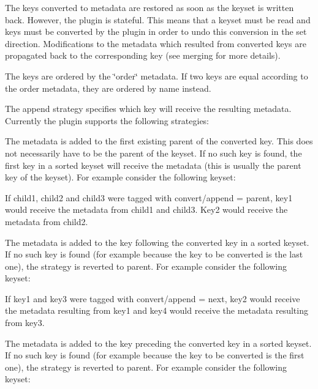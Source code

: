 The keys converted to metadata are restored as soon as the keyset is written back. However, the plugin is stateful. This means that a keyset must be read and keys must be converted by the plugin in order to undo this conversion in the set direction. Modifications to the metadata which resulted from converted keys are propagated back to the corresponding key (see merging for more details).

The keys are ordered by the \char`\"{}order\char`\"{} metadata. If two keys are equal according to the order metadata, they are ordered by name instead.

The append strategy specifies which key will receive the resulting metadata. Currently the plugin supports the following strategies\+:

The metadata is added to the first existing parent of the converted key. This does not necessarily have to be the parent of the keyset. If no such key is found, the first key in a sorted keyset will receive the metadata (this is usually the parent key of the keyset). For example consider the following keyset\+:


\begin{DoxyCode}{0}
\end{DoxyCode}


If child1, child2 and child3 were tagged with {\ttfamily convert/append = parent}, key1 would receive the metadata from child1 and child3. Key2 would receive the metadata from child2.

The metadata is added to the key following the converted key in a sorted keyset. If no such key is found (for example because the key to be converted is the last one), the strategy is reverted to parent. For example consider the following keyset\+:


\begin{DoxyCode}{0}
\end{DoxyCode}


If key1 and key3 were tagged with {\ttfamily convert/append = next}, key2 would receive the metadata resulting from key1 and key4 would receive the metadata resulting from key3.

The metadata is added to the key preceding the converted key in a sorted keyset. If no such key is found (for example because the key to be converted is the first one), the strategy is reverted to parent. For example consider the following keyset\+:



